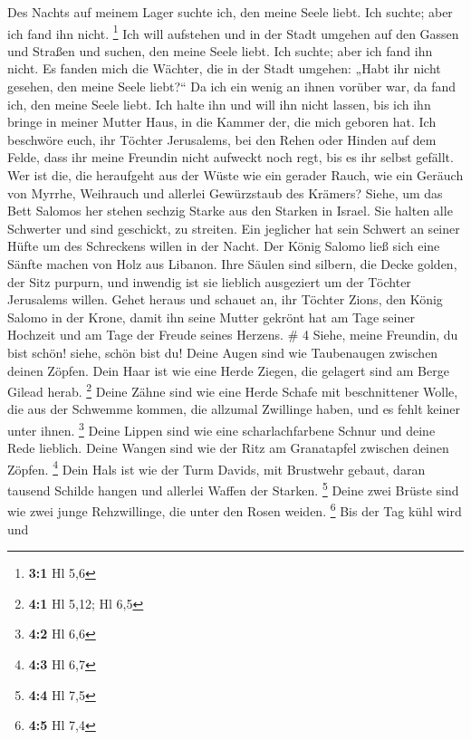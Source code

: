  Des Nachts auf meinem Lager suchte ich, den meine Seele
liebt. Ich suchte; aber ich fand ihn nicht. \footnote{\textbf{3:1} Hl
  5,6}  Ich will aufstehen und in der Stadt umgehen auf
den Gassen und Straßen und suchen, den meine Seele liebt. Ich suchte;
aber ich fand ihn nicht.  Es fanden mich die Wächter, die
in der Stadt umgehen: „Habt ihr nicht gesehen, den meine Seele
liebt?{}``  Da ich ein wenig an ihnen vorüber war, da fand
ich, den meine Seele liebt. Ich halte ihn und will ihn nicht lassen, bis
ich ihn bringe in meiner Mutter Haus, in die Kammer der, die mich
geboren hat.  Ich beschwöre euch, ihr Töchter Jerusalems,
bei den Rehen oder Hinden auf dem Felde, dass ihr meine Freundin nicht
aufweckt noch regt, bis es ihr selbst gefällt.  Wer ist
die, die heraufgeht aus der Wüste wie ein gerader Rauch, wie ein Geräuch
von Myrrhe, Weihrauch und allerlei Gewürzstaub des Krämers?
 Siehe, um das Bett Salomos her stehen sechzig Starke aus
den Starken in Israel.  Sie halten alle Schwerter und sind
geschickt, zu streiten. Ein jeglicher hat sein Schwert an seiner Hüfte
um des Schreckens willen in der Nacht.  Der König Salomo
ließ sich eine Sänfte machen von Holz aus Libanon.  Ihre
Säulen sind silbern, die Decke golden, der Sitz purpurn, und inwendig
ist sie lieblich ausgeziert um der Töchter Jerusalems willen.
 Gehet heraus und schauet an, ihr Töchter Zions, den
König Salomo in der Krone, damit ihn seine Mutter gekrönt hat am Tage
seiner Hochzeit und am Tage der Freude seines Herzens. \# 4
 Siehe, meine Freundin, du bist schön! siehe, schön bist
du! Deine Augen sind wie Taubenaugen zwischen deinen Zöpfen. Dein Haar
ist wie eine Herde Ziegen, die gelagert sind am Berge Gilead herab.
\footnote{\textbf{4:1} Hl 5,12; Hl 6,5}  Deine Zähne sind
wie eine Herde Schafe mit beschnittener Wolle, die aus der Schwemme
kommen, die allzumal Zwillinge haben, und es fehlt keiner unter ihnen.
\footnote{\textbf{4:2} Hl 6,6}  Deine Lippen sind wie eine
scharlachfarbene Schnur und deine Rede lieblich. Deine Wangen sind wie
der Ritz am Granatapfel zwischen deinen Zöpfen. \footnote{\textbf{4:3}
  Hl 6,7}  Dein Hals ist wie der Turm Davids, mit
Brustwehr gebaut, daran tausend Schilde hangen und allerlei Waffen der
Starken. \footnote{\textbf{4:4} Hl 7,5}  Deine zwei Brüste
sind wie zwei junge Rehzwillinge, die unter den Rosen weiden.
\footnote{\textbf{4:5} Hl 7,4}  Bis der Tag kühl wird und
